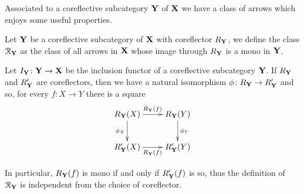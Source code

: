 \documentclass[a4paper,UKenglish,cleveref,pdftex,thm-restate,numberwithinsect]{lipics-v2021}
\def\R{\mathsf{R}}
\def\X{\textbf {\textup{X}}}
\def\Y{\textbf {\textup{Y}}}
\begin{document}
Associated to a coreflective subcategory $\Y$ of $\X$ we have a class of arrows which enjoys some useful properties.

\begin{definition}
	Let $\Y$ be a coreflective subcategory of $\X$ with coreflector $R_\Y$, we define the class $\mathcal{R}_\Y$ as the class of all arrows in $\X$ whose image through $R_\Y$ is a mono in $\Y$.
\end{definition}

\begin{remark}
	Let $I_\Y\colon \Y \to \X$ be the inclusion functor of a coreflective subcategory $\Y$. If $R_\Y$ and $R'_\Y$ are coreflectors, then we have a natural isomorphism $\phi\colon R_\Y\to R'_\Y$ and so, for every $f\colon X\to Y$ there is a square
	\[\xymatrix{ \ar[d]_{\phi_X} R_\Y(X) \ar[r]^{R_\Y(f)}& R_\Y(Y) \ar[d]^{\phi_Y}\\R'_\Y(X) \ar[r]_{R_\Y(f)} & R'_\Y(Y)}\]
	
	In particular, $R_\Y(f)$ is mono if and only if $R'_\Y(f)$ is so, thus the definition of $\mathcal{R}_\Y$ is independent from the choice of coreflector.
\end{remark}
\end{document}
